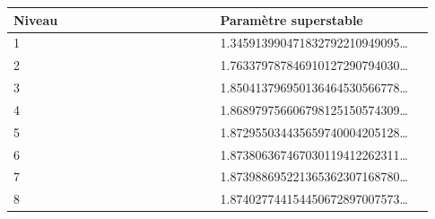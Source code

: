 \begingroup\small
\begin{longtable}{p{0.465\linewidth}p{0.465\linewidth}}
\hline
Niveau & Paramètre superstable \\
\hline
1 & 1.345913990471832792210949095… \\
2 & 1.763379787846910127290794030… \\
3 & 1.850413796950136464530566778… \\
4 & 1.868979756606798125150574309… \\
5 & 1.872955034435659740004205128… \\
6 & 1.873806367467030119412262311… \\
7 & 1.873988695221365362307168780… \\
8 & 1.874027744154450672897007573… \\
\hline\end{longtable}
\endgroup
